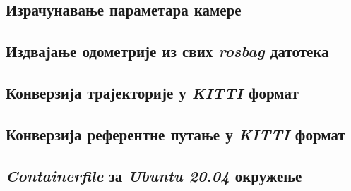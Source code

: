 \documentclass[12pt]{article}
\begin{document}


\subsection*{Израчунавање параметара камере}



\subsection*{Издвајање одометрије из свих \textit{rosbag} датотека}



\subsection*{Конверзија трајекторије у \textit{KITTI} формат}



\subsection*{Конверзија референтне путање у \textit{KITTI} формат}



\subsection*{\textit{Containerfile} за \textit{Ubuntu 20.04} окружење}



\endgroup
\end{document}

